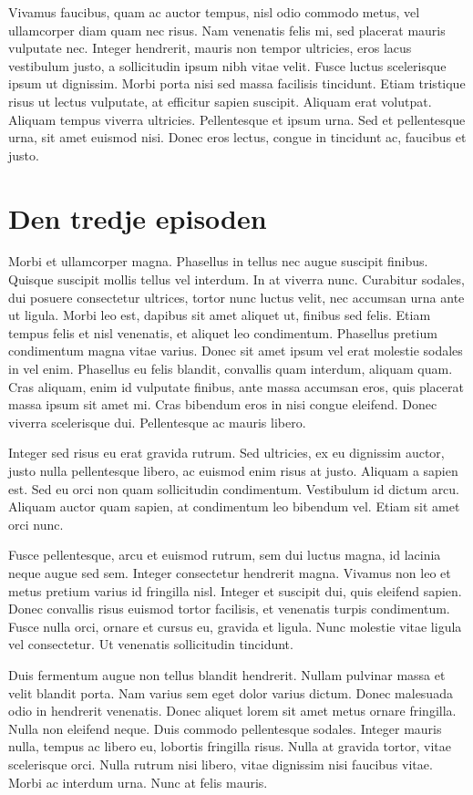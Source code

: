 \documentclass[a4paper,10pt]{article}
\begin{document}
Vivamus faucibus, quam ac auctor tempus, nisl odio commodo metus, vel ullamcorper diam quam nec risus. Nam venenatis felis mi, sed placerat mauris vulputate nec. Integer hendrerit, mauris non tempor ultricies, eros lacus vestibulum justo, a sollicitudin ipsum nibh vitae velit. Fusce luctus scelerisque ipsum ut dignissim. Morbi porta nisi sed massa facilisis tincidunt. Etiam tristique risus ut lectus vulputate, at efficitur sapien suscipit. Aliquam erat volutpat. Aliquam tempus viverra ultricies. Pellentesque et ipsum urna. Sed et pellentesque urna, sit amet euismod nisi. Donec eros lectus, congue in tincidunt ac, faucibus et justo.
\section{Den tredje episoden}
Morbi et ullamcorper magna. Phasellus in tellus nec augue suscipit finibus. Quisque suscipit mollis tellus vel interdum. In at viverra nunc. Curabitur sodales, dui posuere consectetur ultrices, tortor nunc luctus velit, nec accumsan urna ante ut ligula. Morbi leo est, dapibus sit amet aliquet ut, finibus sed felis. Etiam tempus felis et nisl venenatis, et aliquet leo condimentum. Phasellus pretium condimentum magna vitae varius. Donec sit amet ipsum vel erat molestie sodales in vel enim. Phasellus eu felis blandit, convallis quam interdum, aliquam quam. Cras aliquam, enim id vulputate finibus, ante massa accumsan eros, quis placerat massa ipsum sit amet mi. Cras bibendum eros in nisi congue eleifend. Donec viverra scelerisque dui. Pellentesque ac mauris libero.

Integer sed risus eu erat gravida rutrum. Sed ultricies, ex eu dignissim auctor, justo nulla pellentesque libero, ac euismod enim risus at justo. Aliquam a sapien est. Sed eu orci non quam sollicitudin condimentum. Vestibulum id dictum arcu. Aliquam auctor quam sapien, at condimentum leo bibendum vel. Etiam sit amet orci nunc.

Fusce pellentesque, arcu et euismod rutrum, sem dui luctus magna, id lacinia neque augue sed sem. Integer consectetur hendrerit magna. Vivamus non leo et metus pretium varius id fringilla nisl. Integer et suscipit dui, quis eleifend sapien. Donec convallis risus euismod tortor facilisis, et venenatis turpis condimentum. Fusce nulla orci, ornare et cursus eu, gravida et ligula. Nunc molestie vitae ligula vel consectetur. Ut venenatis sollicitudin tincidunt.

Duis fermentum augue non tellus blandit hendrerit. Nullam pulvinar massa et velit blandit porta. Nam varius sem eget dolor varius dictum. Donec malesuada odio in hendrerit venenatis. Donec aliquet lorem sit amet metus ornare fringilla. Nulla non eleifend neque. Duis commodo pellentesque sodales. Integer mauris nulla, tempus ac libero eu, lobortis fringilla risus. Nulla at gravida tortor, vitae scelerisque orci. Nulla rutrum nisi libero, vitae dignissim nisi faucibus vitae. Morbi ac interdum urna. Nunc at felis mauris.
\end{document}
